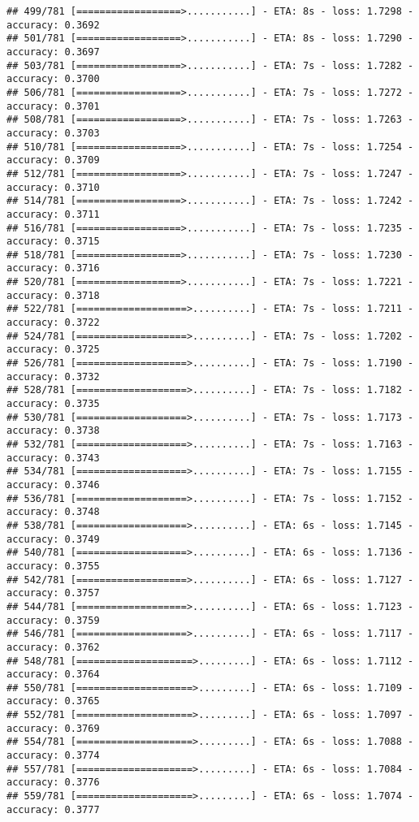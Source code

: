 \documentclass[
]{article}
\begin{document}
\begin{verbatim}
## 499/781 [==================>...........] - ETA: 8s - loss: 1.7298 - accuracy: 0.3692
## 501/781 [==================>...........] - ETA: 8s - loss: 1.7290 - accuracy: 0.3697
## 503/781 [==================>...........] - ETA: 7s - loss: 1.7282 - accuracy: 0.3700
## 506/781 [==================>...........] - ETA: 7s - loss: 1.7272 - accuracy: 0.3701
## 508/781 [==================>...........] - ETA: 7s - loss: 1.7263 - accuracy: 0.3703
## 510/781 [==================>...........] - ETA: 7s - loss: 1.7254 - accuracy: 0.3709
## 512/781 [==================>...........] - ETA: 7s - loss: 1.7247 - accuracy: 0.3710
## 514/781 [==================>...........] - ETA: 7s - loss: 1.7242 - accuracy: 0.3711
## 516/781 [==================>...........] - ETA: 7s - loss: 1.7235 - accuracy: 0.3715
## 518/781 [==================>...........] - ETA: 7s - loss: 1.7230 - accuracy: 0.3716
## 520/781 [==================>...........] - ETA: 7s - loss: 1.7221 - accuracy: 0.3718
## 522/781 [===================>..........] - ETA: 7s - loss: 1.7211 - accuracy: 0.3722
## 524/781 [===================>..........] - ETA: 7s - loss: 1.7202 - accuracy: 0.3725
## 526/781 [===================>..........] - ETA: 7s - loss: 1.7190 - accuracy: 0.3732
## 528/781 [===================>..........] - ETA: 7s - loss: 1.7182 - accuracy: 0.3735
## 530/781 [===================>..........] - ETA: 7s - loss: 1.7173 - accuracy: 0.3738
## 532/781 [===================>..........] - ETA: 7s - loss: 1.7163 - accuracy: 0.3743
## 534/781 [===================>..........] - ETA: 7s - loss: 1.7155 - accuracy: 0.3746
## 536/781 [===================>..........] - ETA: 7s - loss: 1.7152 - accuracy: 0.3748
## 538/781 [===================>..........] - ETA: 6s - loss: 1.7145 - accuracy: 0.3749
## 540/781 [===================>..........] - ETA: 6s - loss: 1.7136 - accuracy: 0.3755
## 542/781 [===================>..........] - ETA: 6s - loss: 1.7127 - accuracy: 0.3757
## 544/781 [===================>..........] - ETA: 6s - loss: 1.7123 - accuracy: 0.3759
## 546/781 [===================>..........] - ETA: 6s - loss: 1.7117 - accuracy: 0.3762
## 548/781 [====================>.........] - ETA: 6s - loss: 1.7112 - accuracy: 0.3764
## 550/781 [====================>.........] - ETA: 6s - loss: 1.7109 - accuracy: 0.3765
## 552/781 [====================>.........] - ETA: 6s - loss: 1.7097 - accuracy: 0.3769
## 554/781 [====================>.........] - ETA: 6s - loss: 1.7088 - accuracy: 0.3774
## 557/781 [====================>.........] - ETA: 6s - loss: 1.7084 - accuracy: 0.3776
## 559/781 [====================>.........] - ETA: 6s - loss: 1.7074 - accuracy: 0.3777

\end{verbatim}
\end{document}

